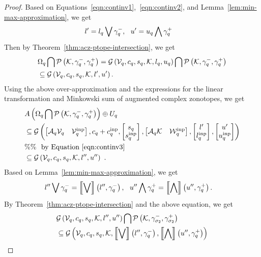 \begin{proof}
Based on Equations~\ref{eqn:continv1},~\ref{eqn:continv2}, and Lemma~\ref{lem:min-max-approximation}, we get
%
\begin{align*}
& l^\prime=l_q\bigvee \gamma_q^-,~~u^\prime=u_q\bigwedge \gamma_q^+
\end{align*}
%
Then by Theorem~\ref{thm:acz-ptope-intersection}, we get
%
\begin{align*}
& \Omega_q\bigcap{\mathcal{P}\left(\mathcal{K},\gamma_q^-,\gamma_q^+\right)}=\mathcal{G}\left(\mathcal{V}_q,c_q,s_q,\mathcal{K},l_q,u_q\right)\bigcap\mathcal{P}\left(\mathcal{K},\gamma_q^-,\gamma_q^+\right)\nonumber\\
& \subseteq \mathcal{G}\left(\mathcal{V}_q,c_q,s_q,\mathcal{K},l^\prime,u^\prime\right).
\end{align*}
%
Using the above over-approximation and the expressions for the linear
transformation and Minkowski sum of augmented complex zonotopes, we
get
%
\begin{align}
& A\left(\Omega_q\bigcap{\mathcal{P}\left(\mathcal{K},\gamma_q^-,\gamma_q^+\right)}\right)\oplus U_q\nonumber\\
& \subseteq \mathcal{G}\left(
\left[\begin{matrix}\mathcal{A}_q\mathcal{V}_q & \mathcal{V}^{\operatorname{inp}}_q\end{matrix}\right]
,
c_q+c^{\operatorname{inp}}_q
,
\left[\begin{matrix}s_q\\ s^{\operatorname{inp}}_q\end{matrix}\right]
,
\left[\begin{matrix}\mathcal{A}_q\mathcal{K} & \mathcal{W}^{\operatorname{inp}}_q\end{matrix}\right]
,
\left[\begin{matrix}l^\prime\\l^{\operatorname{inp}}_q\end{matrix}\right]
,
\left[\begin{matrix}u^\prime\\ u^{\operatorname{inp}}_q\end{matrix}\right]
\right)\nonumber\\
& \%\%~~\text{by Equation~\ref{eqn:continv3}}\nonumber\\
& \subseteq \mathcal{G}\left(\mathcal{V}_q,c_q,s_q,\mathcal{K},l^{\prime\prime},u^{\prime\prime}\right)~\label{eqn:proof-continv1}.
\end{align}
%
Based on Lemma~\ref{lem:min-max-approximation}, we get
%
\begin{align*}
& l^{\prime\prime}\bigvee \gamma_q^-=\left\llbracket\bigvee\right\rrbracket\left(l^{\prime\prime},\gamma_q^-\right),~~
u^{\prime\prime}\bigwedge \gamma_q^+=\left\llbracket\bigwedge\right\rrbracket\left(u^{\prime\prime},\gamma_q^+\right).
\end{align*}
%
By Theorem~\ref{thm:acz-ptope-intersection} and the above equation, we get
%
\begin{align}
& \acztope{\ptemp_\loc}{\cen_\loc}{\sfact_\loc}{\qtemp}{l^\dpr}{u^\dpr}\bigcap\ptope{\qtemp}{\lsys{\stay_{\edge_2}}}{\usys{\stay_{\edge_2}}}\nonumber\\
& \subseteq \acztope{\ptemp_\loc}{\cen_\loc}{\sfact_\loc}{\qtemp}{\maxapprox{l^\dpr}{\lsys{\stay_\loc}}}{\minapprox{u^\dpr}{\usys{\stay_\loc}}}\nonumber\\

\end{align}
\end{proof}
